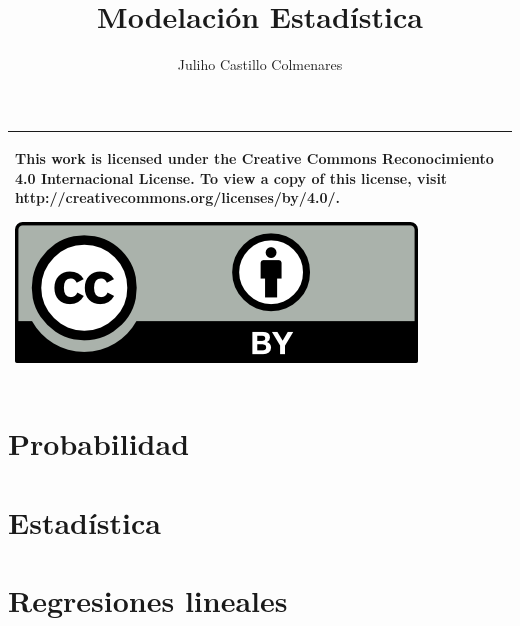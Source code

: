 \documentclass[
]{tufte-book}
\title{Modelación Estadística}
\author{Juliho Castillo Colmenares}
\begin{document}
	\maketitle
\begin{tabular}{|p{}|}
	\hline
	This work is licensed under the Creative Commons Reconocimiento 4.0 Internacional License. To view a copy of this license, visit
	http://creativecommons.org/licenses/by/4.0/.
	\begin{center}
		\includegraphics[scale=1]{./licencia/by.png}
	\end{center}\\
	\hline
\end{tabular}
\tableofcontents

\chapter{Probabilidad}












\chapter{Estadística}










\chapter{Regresiones lineales}










\end{document}
